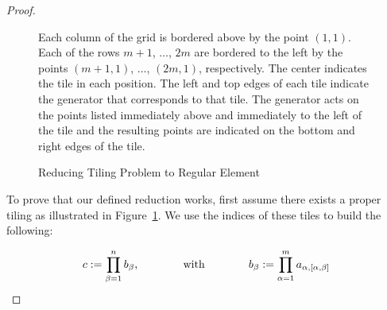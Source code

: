 \documentclass{amsart}
\theoremstyle{remark}
\numberwithin{equation}{section}
\begin{document}
\begin{proof}
\begin{figure}
\caption{Reducing Tiling Problem to Regular Element} \label{fig:tile}

\begin{flushleft} Each column of the grid is bordered above by the point $(1,1)$. Each of the rows $m+1$, $\dots$, $2m$ are bordered to the left by the points $(m+1,1)$, $\dots$, $(2m,1)$, respectively. The center indicates the tile in each position. The left and top edges of each tile indicate the generator that corresponds to that tile. The generator acts on the points listed immediately above and immediately to the left of the tile and the resulting points are indicated on the bottom and right edges of the tile. \end{flushleft}

\end{figure}

To prove that our defined reduction works, first assume there exists a proper tiling as illustrated in Figure~\ref{fig:tile}. We use the indices of these tiles to build the following:

$$c:= \prod \limits_{\beta = 1}\limits^n b_\beta, \hspace{.5in}\text{ with }\hspace{.5in} b_\beta := \prod \limits_{\alpha=1} \limits^m a_{\alpha,[\alpha,\beta]}$$


\end{proof}
\end{document}
